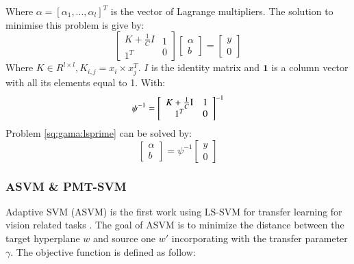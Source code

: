 Where $\alpha = [ \alpha_1,...,\alpha_l]^T $ is the vector of Lagrange multipliers. The solution to minimise this problem is give by:
\begin{equation}\label{eq:single:orgmatrix}
\left[ {\begin{array}{*{20}{c}}
	{K  + \frac{1}{C}{I}}\\
	1^T
	\end{array}\begin{array}{*{20}{c}}
	1\\
	0
	\end{array}} \right]\left[ {\begin{array}{*{20}{c}}
	\alpha \\
	b
	\end{array}} \right] = \left[ \begin{array}{l}
y\\
0
\end{array} \right]
\end{equation}
Where $K \in R^{l \times l},K_{i,j}=x_i \times x_j^T$. $I$ is the identity matrix and $\mathbf{1}$ is a column vector with all its elements equal to 1. With:
\begin{equation}\label{eq:gama:psi}
\psi^{-1} = \left[ {\begin{array}{*{20}{c}}
	{K  + \frac{1}{C}{\rm I}}\\
	1^T
	\end{array}\begin{array}{*{20}{c}}
	1\\
	0
	\end{array}} \right]^{-1}
\end{equation}
Problem \eqref{sq:gama:lsprime} can be solved by:
\begin{equation}
\left[ {\begin{array}{*{20}{c}}
	\alpha \\
	b
	\end{array}} \right] = \psi^{-1}\left[ \begin{array}{l}
y\\
0
\end{array} \right]
\end{equation}

\subsubsection{ASVM \& PMT-SVM}

Adaptive SVM (ASVM) is the first work using LS-SVM for transfer learning for vision related tasks \cite{yang2007adapting}. The goal of ASVM is to minimize the distance between the target hyperplane $w$ and source one $w'$ incorporating with the transfer parameter $\gamma$. The objective function is defined as follow:

